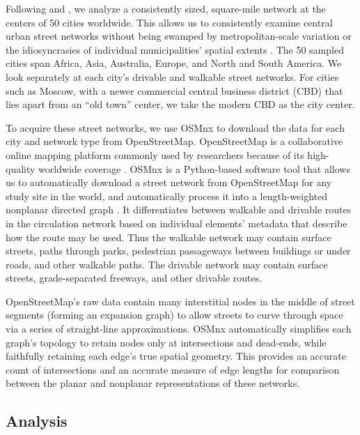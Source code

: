 \documentclass[Afour,sageh,times]{sagej}
\begin{document}
Following \citet{jacobs_great_1995} and \citet{cardillo_structural_2006}, we analyze a consistently sized, square-mile network at the centers of 50 cities worldwide. This allows us to consistently examine central urban street networks without being swamped by metropolitan-scale variation or the idiosyncrasies of individual municipalities' spatial extents \citep{gil_street_2017}. The 50 sampled cities span Africa, Asia, Australia, Europe, and North and South America. We look separately at each city's drivable and walkable street networks. For cities such as Moscow, with a newer commercial central business district (CBD) that lies apart from an \enquote{old town} center, we take the modern CBD as the city center.

To acquire these street networks, we use OSMnx to download the data for each city and network type from OpenStreetMap. OpenStreetMap is a collaborative online mapping platform commonly used by researchers because of its high-quality worldwide coverage \citep{haklay_how_2010,jokar_arsanjani_openstreetmap_2015}. OSMnx is a Python-based software tool that allows us to automatically download a street network from OpenStreetMap for any study site in the world, and automatically process it into a length-weighted nonplanar directed graph \citep{boeing_osmnx:_2017}. It differentiates between walkable and drivable routes in the circulation network based on individual elements' metadata that describe how the route may be used. Thus the walkable network may contain surface streets, paths through parks, pedestrian passageways between buildings or under roads, and other walkable paths. The drivable network may contain surface streets, grade-separated freeways, and other drivable routes.

OpenStreetMap's raw data contain many interstitial nodes in the middle of street segments (forming an expansion graph) to allow streets to curve through space via a series of straight-line approximations. OSMnx automatically simplifies each graph's topology to retain nodes only at intersections and dead-ends, while faithfully retaining each edge's true spatial geometry. This provides an accurate count of intersections and an accurate measure of edge lengths for comparison between the planar and nonplanar representations of these networks.

\subsection{Analysis}
\end{document}
